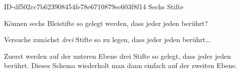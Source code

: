 %
%
%
\providecommand{\stift}[3]
{%
  \begin{scope}[xshift=#1, yshift=#2, rotate=#3]
    \filldraw[fill=white!40!black] (0.00cm, 0.00cm) rectangle (5.00mm, 7.00cm);
    \filldraw[fill=white!80!black]
             (0.00cm, 7.00cm) --
             (2.50mm, 8.00cm) --
             (5.00mm, 7.00cm) -- cycle;
    \begin{scope}
      \clip (0.00cm, 7.00cm) --
            (2.50mm, 8.00cm) --
            (5.00mm, 7.00cm) -- cycle;
      \fill[fill=black] (2.50mm, 8.00cm) circle (2.00mm);
    \end{scope}
  \end{scope}%
}

\begin{exercise}
      {ID-df502cc7b623908454fe78e6710879ec603f8f14}
      {Sechs Stifte}
  \ifproblem\problem\par
    Können sechs Bleistifte so gelegt werden, dass jeder jeden berührt?
    \begin{center}
    \end{center}
  \fi
  \ifoutline\outline\par
    Versuche zunächst \emph{drei} Stifte so zu legen, dass jeder
    jeden berührt\ldots
  \fi
  \ifoutcome\outcome\par
    Zuerst werden auf der unteren Ebene drei Stifte so gelegt,
    dass jeder jeden berührt. Dieses Schema wiederholt man dann
    einfach auf der zweiten Ebene.
    \begin{center}
    \end{center}
  \fi
\end{exercise}
